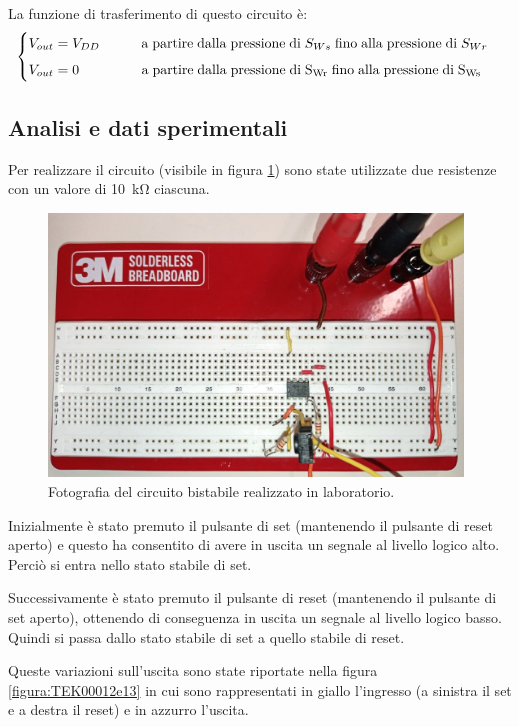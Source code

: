 \documentclass{report}
\begin{document}
La funzione di trasferimento di questo circuito è:
\begin{equation}
	\begin{cases}
		V_{out}= V_{DD}\indent\indent \mathrm{a\;partire\;dalla\;pressione\;di\;} S_{Ws} \mathrm{\;fino\;alla\;pressione\;di\;} S_{Wr}\\[5pt]
		V_{out}= 0\indent\indent\indent \mathrm{{a\;partire\;dalla\;pressione\;di\;} S_{Wr} \mathrm{\;fino\;alla\;pressione\;di\;} S_{Ws}}\\ %
	\end{cases}
\end{equation}

\subsection{Analisi e dati sperimentali}
Per realizzare il circuito (visibile in figura \ref{figura:circuito2}) sono state utilizzate due resistenze con un valore di \SI{10}{\kilo\ohm} ciascuna.

\begin{figure}[h!]
	\centering
	\includegraphics[height=7cm]{immagini/circuito2}
	\caption{Fotografia del circuito bistabile realizzato in laboratorio.}
	\label{figura:circuito2}
\end{figure}

\noindent Inizialmente è stato premuto il pulsante di set (mantenendo il pulsante di reset aperto) e questo ha consentito di avere in uscita un segnale al livello logico alto. Perciò si entra nello stato stabile di set.

Successivamente è stato premuto il pulsante di reset (mantenendo il pulsante di set aperto), ottenendo di conseguenza in uscita un segnale al livello logico basso. Quindi si passa dallo stato stabile di set a quello stabile di reset.

Queste variazioni sull'uscita sono state riportate nella figura \ref{figura:TEK00012e13} in cui sono rappresentati in giallo l'ingresso (a sinistra il set e a destra il reset) e in azzurro l'uscita.
\end{document}
